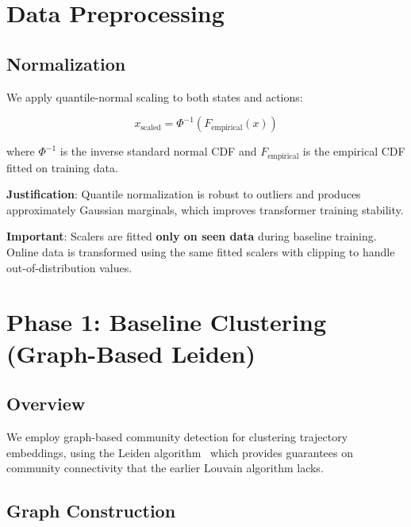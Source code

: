 \documentclass{article}
\begin{document}
\section{Data Preprocessing}

\subsection{Normalization}

We apply quantile-normal scaling to both states and actions:

\begin{equation}
    x_{\text{scaled}} = \Phi^{-1}\left(F_{\text{empirical}}(x)\right)
\end{equation}

where $\Phi^{-1}$ is the inverse standard normal CDF and $F_{\text{empirical}}$ is the empirical CDF fitted on training data.

\textbf{Justification}: Quantile normalization is robust to outliers and produces approximately Gaussian marginals, which improves transformer training stability.

\textbf{Important}: Scalers are fitted \textbf{only on seen data} during baseline training. Online data is transformed using the same fitted scalers with clipping to handle out-of-distribution values.

\section{Phase 1: Baseline Clustering (Graph-Based Leiden)}

\subsection{Overview}

We employ graph-based community detection for clustering trajectory embeddings, using the Leiden algorithm~\cite{traag2019louvain} which provides guarantees on community connectivity that the earlier Louvain algorithm lacks.

\subsection{Graph Construction}
\end{document}
